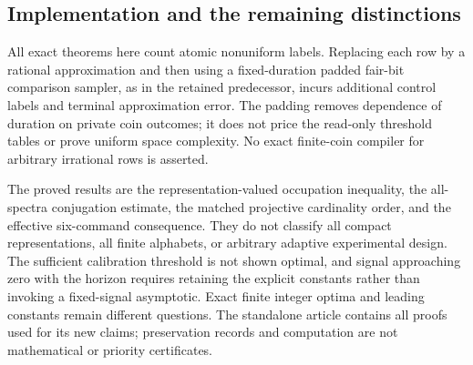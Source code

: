 \subsection{Implementation and the remaining distinctions}
All exact theorems here count atomic nonuniform labels. Replacing each
row by a rational approximation and then using a fixed-duration padded
fair-bit comparison sampler, as in the retained predecessor, incurs
additional control labels and terminal approximation error. The padding
removes dependence of duration on private coin outcomes; it does not
price the read-only threshold tables or prove uniform space complexity.
No exact finite-coin compiler for arbitrary irrational rows is asserted.

The proved results are the representation-valued occupation inequality,
the all-spectra conjugation estimate, the matched projective cardinality
order, and the effective six-command consequence. They do not classify
all compact representations, all finite alphabets, or arbitrary adaptive
experimental design. The sufficient calibration threshold is not shown
optimal, and signal approaching zero with the horizon requires retaining
the explicit constants rather than invoking a fixed-signal asymptotic.
Exact finite integer optima and leading constants remain different
questions. The standalone article contains all proofs used for its new
claims; preservation records and computation are not mathematical or
priority certificates.
